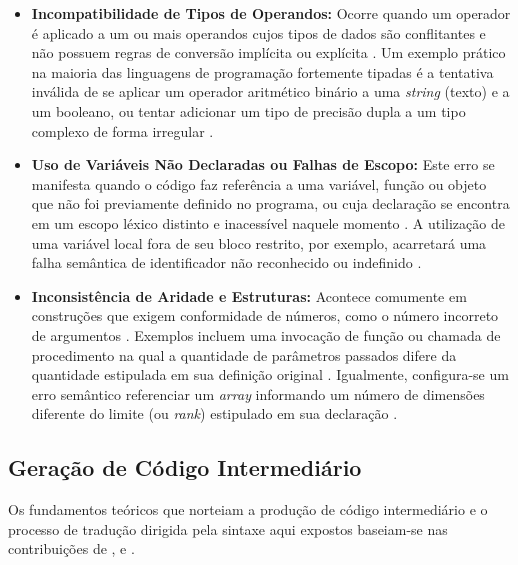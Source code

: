 \begin{itemize}
    \item \textbf{Incompatibilidade de Tipos de Operandos:} Ocorre quando um operador é aplicado a um ou mais operandos cujos tipos de dados são conflitantes e não possuem regras de conversão implícita ou explícita \cite{aho1995, cooper2012}. %
    Um exemplo prático na maioria das linguagens de programação fortemente tipadas é a tentativa inválida de se aplicar um operador aritmético binário a uma \textit{string} (texto) e a um booleano, ou tentar adicionar um tipo de precisão dupla a um tipo complexo de forma irregular \cite{cooper2012}. %
    
    \item \textbf{Uso de Variáveis Não Declaradas ou Falhas de Escopo:} Este erro se manifesta quando o código faz referência a uma variável, função ou objeto que não foi previamente definido no programa, ou cuja declaração se encontra em um escopo léxico distinto e inacessível naquele momento \cite{cooper2012, nystrom2021}. %
    A utilização de uma variável local fora de seu bloco restrito, por exemplo, acarretará uma falha semântica de identificador não reconhecido ou indefinido \cite{nystrom2021}. %
    
    \item \textbf{Inconsistência de Aridade e Estruturas:} Acontece comumente em construções que exigem conformidade de números, como o número incorreto de argumentos \cite{cooper2012}. %
    Exemplos incluem uma invocação de função ou chamada de procedimento na qual a quantidade de parâmetros passados difere da quantidade estipulada em sua definição original \cite{cooper2012, nystrom2021}. %
    Igualmente, configura-se um erro semântico referenciar um \textit{array} informando um número de dimensões diferente do limite (ou \textit{rank}) estipulado em sua declaração \cite{cooper2012}. %


\end{itemize}


\subsection{Geração de Código Intermediário}

Os fundamentos teóricos que norteiam a produção de código intermediário e o processo de tradução dirigida pela sintaxe aqui expostos baseiam-se nas contribuições de ,  e .

